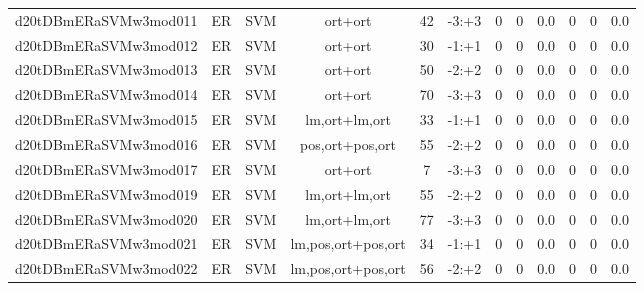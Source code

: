 \documentclass[a4paper]{article}
\begin{document}
\begin{landscape}
\begin{center}
\begin{tabular}{ |c|c|c|c|c|c|c|c|c|c|c|c|}
 
 	
 	\small{ d20tDBmERaSVMw3mod011 } & ER & SVM & ort+ort  &  42 &  -3:+3  &  0 & 0 & 0.0  &  0 & 0 & 0.0 \\
 	

 
 	
 	\small{ d20tDBmERaSVMw3mod012 } & ER & SVM & ort+ort  &  30 &  -1:+1  &  0 & 0 & 0.0  &  0 & 0 & 0.0 \\
 	

 
 	
 	\small{ d20tDBmERaSVMw3mod013 } & ER & SVM & ort+ort  &  50 &  -2:+2  &  0 & 0 & 0.0  &  0 & 0 & 0.0 \\
 	

 
 	
 	\small{ d20tDBmERaSVMw3mod014 } & ER & SVM & ort+ort  &  70 &  -3:+3  &  0 & 0 & 0.0  &  0 & 0 & 0.0 \\
 	

 
 	
 	\small{ d20tDBmERaSVMw3mod015 } & ER & SVM & lm,ort+lm,ort  &  33 &  -1:+1  &  0 & 0 & 0.0  &  0 & 0 & 0.0 \\
 	

 
 	
 	\small{ d20tDBmERaSVMw3mod016 } & ER & SVM & pos,ort+pos,ort  &  55 &  -2:+2  &  0 & 0 & 0.0  &  0 & 0 & 0.0 \\
 	

 
 	
 	\small{ d20tDBmERaSVMw3mod017 } & ER & SVM & ort+ort  &  7 &  -3:+3  &  0 & 0 & 0.0  &  0 & 0 & 0.0 \\
 	

 
 	
 	\small{ d20tDBmERaSVMw3mod019 } & ER & SVM & lm,ort+lm,ort  &  55 &  -2:+2  &  0 & 0 & 0.0  &  0 & 0 & 0.0 \\
 	

 
 	
 	\small{ d20tDBmERaSVMw3mod020 } & ER & SVM & lm,ort+lm,ort  &  77 &  -3:+3  &  0 & 0 & 0.0  &  0 & 0 & 0.0 \\
 	

 
 	
 	\small{ d20tDBmERaSVMw3mod021 } & ER & SVM & lm,pos,ort+pos,ort  &  34 &  -1:+1  &  0 & 0 & 0.0  &  0 & 0 & 0.0 \\
 	

 
 	
 	\small{ d20tDBmERaSVMw3mod022 } & ER & SVM & lm,pos,ort+pos,ort  &  56 &  -2:+2  &  0 & 0 & 0.0  &  0 & 0 & 0.0 \\
 	


\end{tabular}
\end{center}
\end{landscape}
\end{document}
